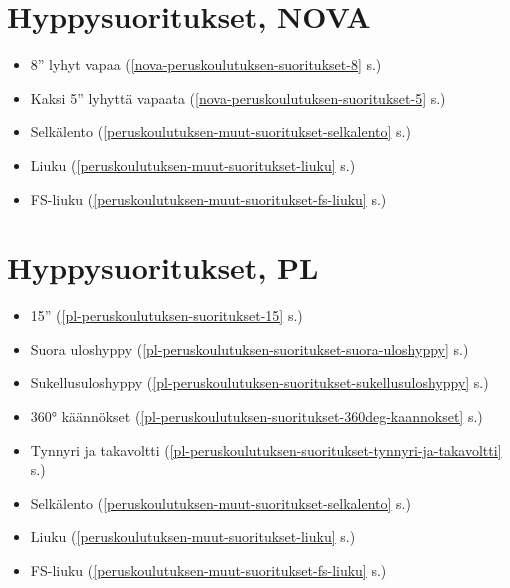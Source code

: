\section{ Hyppysuoritukset, NOVA }
\label{yhteenveto-peruskoulutus-hyppysuoritukset-nova}

\begin{itemize}
\item  8'' lyhyt vapaa (\ref{nova-peruskoulutuksen-suoritukset-8} s.\pageref{nova-peruskoulutuksen-suoritukset-8}) 
\item  Kaksi 5'' lyhyttä vapaata (\ref{nova-peruskoulutuksen-suoritukset-5} s.\pageref{nova-peruskoulutuksen-suoritukset-5}) 
\item  Selkälento (\ref{peruskoulutuksen-muut-suoritukset-selkalento} s.\pageref{peruskoulutuksen-muut-suoritukset-selkalento}) 
\item  Liuku (\ref{peruskoulutuksen-muut-suoritukset-liuku} s.\pageref{peruskoulutuksen-muut-suoritukset-liuku}) 
\item  FS-liuku (\ref{peruskoulutuksen-muut-suoritukset-fs-liuku} s.\pageref{peruskoulutuksen-muut-suoritukset-fs-liuku}) 
\end{itemize}
\section{ Hyppysuoritukset, PL }
\label{yhteenveto-peruskoulutus-hyppysuoritukset-pl}

\begin{itemize}
\item  15'' (\ref{pl-peruskoulutuksen-suoritukset-15} s.\pageref{pl-peruskoulutuksen-suoritukset-15}) 
\item  Suora uloshyppy (\ref{pl-peruskoulutuksen-suoritukset-suora-uloshyppy} s.\pageref{pl-peruskoulutuksen-suoritukset-suora-uloshyppy}) 
\item  Sukellusuloshyppy (\ref{pl-peruskoulutuksen-suoritukset-sukellusuloshyppy} s.\pageref{pl-peruskoulutuksen-suoritukset-sukellusuloshyppy}) 
\item  360° käännökset (\ref{pl-peruskoulutuksen-suoritukset-360deg-kaannokset} s.\pageref{pl-peruskoulutuksen-suoritukset-360deg-kaannokset}) 
\item  Tynnyri ja takavoltti (\ref{pl-peruskoulutuksen-suoritukset-tynnyri-ja-takavoltti} s.\pageref{pl-peruskoulutuksen-suoritukset-tynnyri-ja-takavoltti}) 
\item  Selkälento (\ref{peruskoulutuksen-muut-suoritukset-selkalento} s.\pageref{peruskoulutuksen-muut-suoritukset-selkalento}) 
\item  Liuku (\ref{peruskoulutuksen-muut-suoritukset-liuku} s.\pageref{peruskoulutuksen-muut-suoritukset-liuku}) 
\item  FS-liuku (\ref{peruskoulutuksen-muut-suoritukset-fs-liuku} s.\pageref{peruskoulutuksen-muut-suoritukset-fs-liuku}) 
\end{itemize}
